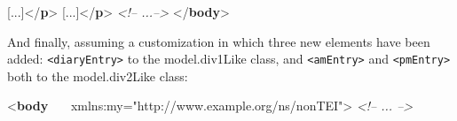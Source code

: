 \begin{shaded}
\hspace*{1em}\hspace*{1em}[...]{</\textbf{p}>}\mbox{}\newline 
\hspace*{1em}\mbox{}\newline 
\hspace*{1em}\mbox{}\newline 
\hspace*{1em}\hspace*{1em}[...]{</\textbf{p}>}\mbox{}\newline 
\hspace*{1em}\mbox{}\newline 
{}\mbox{}\newline 
\textit{<!-- ...-->}\mbox{}\newline 
{</\textbf{body}>}\end{shaded}\egroup\par \noindent  And finally, assuming a customization in which three new elements have been added: \texttt{<diaryEntry>} to the \textsf{model.div1Like} class, and \texttt{<amEntry>} and \texttt{<pmEntry>} both to the \textsf{model.div2Like} class: \par\bgroup{}\exampleFont \begin{shaded}\noindent\mbox{}{<\textbf{body}\mbox{}\newline 
   xmlns:my="http://www.example.org/ns/nonTEI">}\mbox{}\newline 
{}\mbox{}\newline 
\textit{<!-- ... -->}\mbox{}\newline 
{}\mbox{}\newline 
{}\mbox{}\newline 

\end{shaded}
